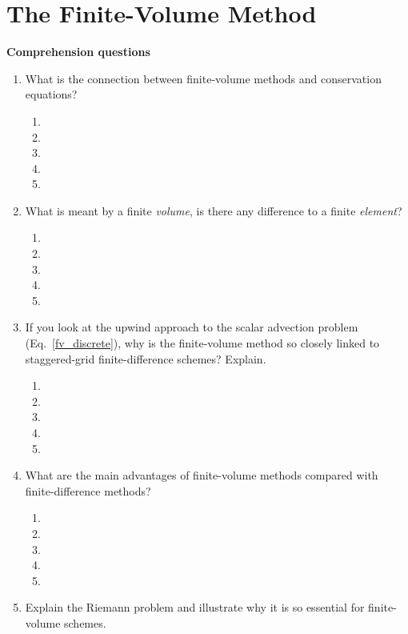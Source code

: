 
\chapter{The Finite-Volume Method}

{\bf Comprehension questions}
\begin{enumerate}
\item What is the connection between finite-volume methods and conservation equations?
\begin{enumerate}
\item[]
\item[]
\item[] 
\item[]
\item[] 
\end{enumerate}
\item What is meant by a finite {\it volume}, is there any difference to a finite {\it element}?
\begin{enumerate}
\item[]
\item[]
\item[] 
\item[]
\item[] 
\end{enumerate}
\item If you look at the upwind approach to the scalar advection problem (Eq.~\ref{fv_discrete}), why is the finite-volume method so closely linked to staggered-grid finite-difference schemes? Explain.
\begin{enumerate}
\item[]
\item[]
\item[] 
\item[]
\item[] 
\end{enumerate}
\item What are the main  advantages of finite-volume methods compared with finite-difference methods?
\begin{enumerate}
\item[]
\item[]
\item[] 
\item[]
\item[] 
\end{enumerate}
\item Explain the Riemann problem and illustrate why it is so essential for finite-volume schemes. 
\begin{enumerate}

\end{enumerate}
\end{enumerate}
